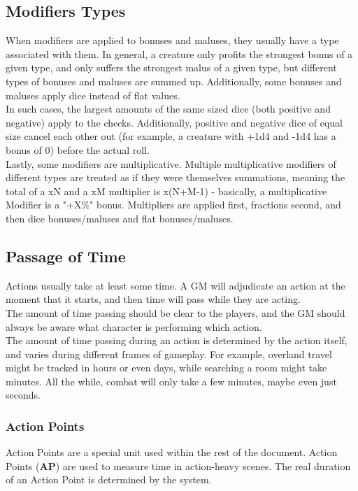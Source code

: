 \subsection{Modifiers Types}\label{subsec:modifiertypes}
When modifiers are applied to bonuses and maluses, they usually have a type associated with them.
In general, a creature only profits the strongest bonus of a given type, and only suffers the strongest malus of a given type, but different types of bonuses and maluses are summed up.
Additionally, some bonuses and maluses apply dice instead of flat values.\\
In such cases, the largest amounts of the same sized dice (both positive and negative) apply to the checks.
Additionally, positive and negative dice of equal size cancel each other out (for example, a creature with +1d4 and -1d4 has a bonus of 0) before the actual roll.\\
Lastly, some modifiers are multiplicative.
Multiple multiplicative modifiers of different types are treated as if they were themselves summations, meaning the total of a xN and a xM multiplier is x(N+M-1) - basically, a multiplicative Modifier is a "+X\%" bonus.
Multipliers are applied first, fractions second, and then dice bonuses/maluses and flat bonuses/maluses.\\

\subsection{Passage of Time}\label{subsec:passageoftime}
Actions usually take at least some time.
A GM will adjudicate an action at the moment that it starts, and then time will pass while they are acting.\\
The amount of time passing should be clear to the players, and the GM should always be aware what character is performing which action.\\
The amount of time passing during an action is determined by the action itself, and varies during different frames of gameplay.
For example, overland travel might be tracked in hours or even days, while searching a room might take minutes.
All the while, combat will only take a few minutes, maybe even just seconds.

\subsubsection{Action Points}\label{subsubsec:actionpoints}
Action Points are a special unit used within the rest of the document.
Action Points (\textbf{AP}) are used to measure time in action-heavy scenes.
The real duration of an Action Point is determined by the system.